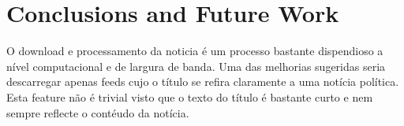 \section{Conclusions and Future Work}
O download e processamento da noticia é um processo bastante dispendioso a nível computacional e de largura de banda. Uma das melhorias sugeridas seria descarregar apenas feeds cujo o título se refira claramente a uma notícia política. Esta feature não é trivial visto que o texto do título é bastante curto e nem sempre reflecte o contéudo da notícia.